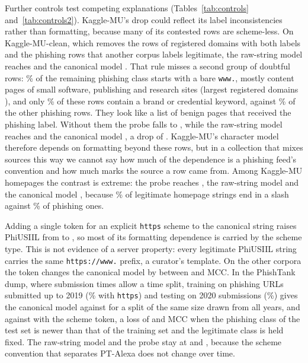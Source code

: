 Further controls test competing explanations (Tables~\ref{tab:controls} and~\ref{tab:controls2}). Kaggle-MU's drop could reflect its label inconsistencies rather than formatting, because many of its contested rows are scheme-less. On Kaggle-MU-clean, which removes the \KCleanNMixedRows{} rows of registered domains with both labels and the phishing rows that another corpus labels legitimate, the raw-string model reaches \KCleanCharRaw{} and the canonical model \KCleanCharCanon. That rule misses a second group of doubtful rows: \KCleanBareWwwPct\% of the remaining phishing class starts with a bare \texttt{www.}, mostly content pages of small software, publishing and research sites (largest registered domains \KWwwTopDomains), and only \KWwwKwShare\% of these rows contain a brand or credential keyword, against \KOtherKwShare\% of the other phishing rows. They look like a list of benign pages that received the phishing label. Without them the probe falls to \KCleanTwoPresentationHttps, while the raw-string model reaches \KCleanTwoCharRaw{} and the canonical model \KCleanTwoCharCanon, a drop of \KCleanTwoDrop. Kaggle-MU's character model therefore depends on formatting beyond these rows, but in a collection that mixes sources this way we cannot say how much of the dependence is a phishing feed's convention and how much marks the source a row came from. Among Kaggle-MU homepages the contrast is extreme: the probe reaches \HomeKaggleMUPresentationHttps, the raw-string model \HomeKaggleMUCharRaw{} and the canonical model \HomeKaggleMUCharCanon, because \HomeSlashLegitKaggleMU\% of legitimate homepage strings end in a slash against \HomeSlashPhishKaggleMU\% of phishing ones.

Adding a single token for an explicit \texttt{https} scheme to the canonical string raises PhiUSIIL from \WPhiUSIILRandomCharCanon{} to \CanonHttpsPhiUSIIL, so most of its formatting dependence is carried by the scheme type. This is not evidence of a server property: every legitimate PhiUSIIL string carries the same \texttt{https://www.} prefix, a curator's template. On the other corpora the token changes the canonical model by between \CanonHttpsGainPhishStorm{} and \CanonHttpsGainPTAlexa{} MCC. In the PhishTank dump, where submission times allow a time split, training on phishing URLs submitted up to 2019 (\TimeTrainHttps\% with \texttt{https}) and testing on 2020 submissions (\TimeTestHttps\%) gives the canonical model \TimeCharCanon{} against \TimeRandCharCanon{} for a split of the same size drawn from all years, and \TimeCharCanonHttps{} against \TimeRandCharCanonHttps{} with the scheme token, a loss of \TimeGapCharCanon{} and \TimeGapCharCanonHttps{} MCC when the phishing class of the test set is newer than that of the training set and the legitimate class is held fixed. The raw-string model and the probe stay at \TimeCharRaw{} and \TimePresentationHttps{}, because the scheme convention that separates PT-Alexa does not change over time.

